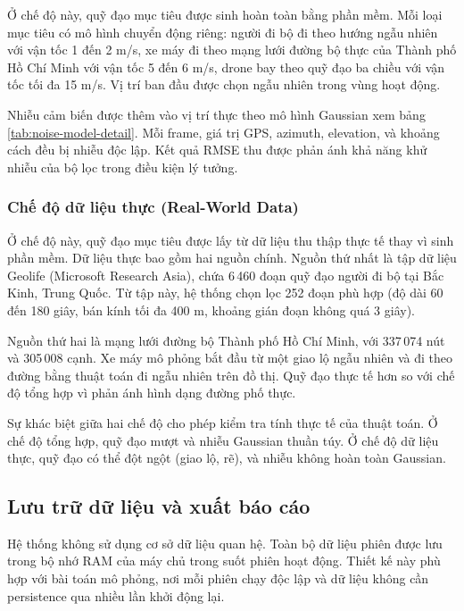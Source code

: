 \hspace{0.5cm} Ở chế độ này, quỹ đạo mục tiêu được sinh hoàn toàn bằng phần mềm. Mỗi loại mục tiêu có mô hình chuyển động riêng: người đi bộ đi theo hướng ngẫu nhiên với vận tốc 1 đến 2 m/s, xe máy đi theo mạng lưới đường bộ thực của Thành phố Hồ Chí Minh với vận tốc 5 đến 6 m/s, drone bay theo quỹ đạo ba chiều với vận tốc tối đa 15 m/s. Vị trí ban đầu được chọn ngẫu nhiên trong vùng hoạt động.

Nhiễu cảm biến được thêm vào vị trí thực theo mô hình Gaussian xem bảng \ref{tab:noise-model-detail}. Mỗi frame, giá trị GPS, azimuth, elevation, và khoảng cách đều bị nhiễu độc lập. Kết quả RMSE thu được phản ánh khả năng khử nhiễu của bộ lọc trong điều kiện lý tưởng.

\subsubsection{Chế độ dữ liệu thực (Real-World Data)}

\hspace{0.5cm} Ở chế độ này, quỹ đạo mục tiêu được lấy từ dữ liệu thu thập thực tế thay vì sinh phần mềm. Dữ liệu thực bao gồm hai nguồn chính. Nguồn thứ nhất là tập dữ liệu Geolife (Microsoft Research Asia), chứa 6\,460 đoạn quỹ đạo người đi bộ tại Bắc Kinh, Trung Quốc. Từ tập này, hệ thống chọn lọc 252 đoạn phù hợp (độ dài 60 đến 180 giây, bán kính tối đa 400 m, khoảng gián đoạn không quá 3 giây).

Nguồn thứ hai là mạng lưới đường bộ Thành phố Hồ Chí Minh, với 337\,074 nút và 305\,008 cạnh. Xe máy mô phỏng bắt đầu từ một giao lộ ngẫu nhiên và đi theo đường bằng thuật toán đi ngẫu nhiên trên đồ thị. Quỹ đạo thực tế hơn so với chế độ tổng hợp vì phản ánh hình dạng đường phố thực.

Sự khác biệt giữa hai chế độ cho phép kiểm tra tính thực tế của thuật toán. Ở chế độ tổng hợp, quỹ đạo mượt và nhiễu Gaussian thuần túy. Ở chế độ dữ liệu thực, quỹ đạo có thể đột ngột (giao lộ, rẽ), và nhiễu không hoàn toàn Gaussian.

\subsection{Lưu trữ dữ liệu và xuất báo cáo}

\hspace{0.5cm} Hệ thống không sử dụng cơ sở dữ liệu quan hệ. Toàn bộ dữ liệu phiên được lưu trong bộ nhớ RAM của máy chủ trong suốt phiên hoạt động. Thiết kế này phù hợp với bài toán mô phỏng, nơi mỗi phiên chạy độc lập và dữ liệu không cần persistence qua nhiều lần khởi động lại.

